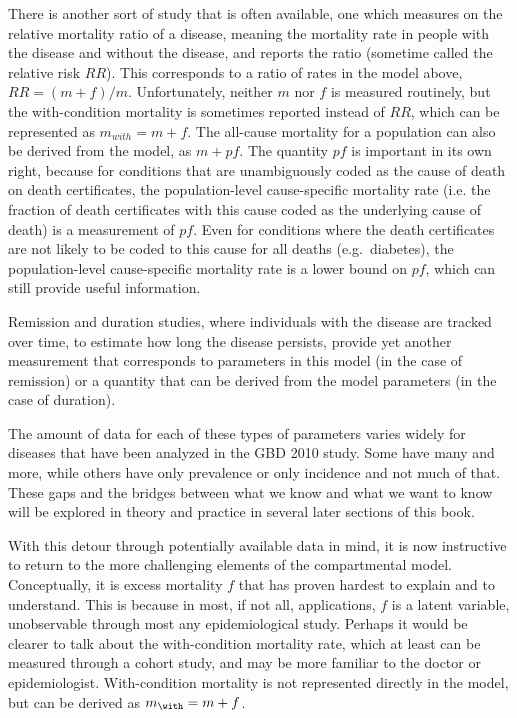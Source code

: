 There is another sort of study that is often available, one which measures on the relative mortality ratio of a disease, meaning the mortality rate in people with the disease and without the disease, and reports the ratio (sometime called the relative risk $RR$).  This corresponds to a ratio of rates in the model above, $RR = (m+f) / m$.  Unfortunately, neither $m$ nor $f$ is measured routinely, but the with-condition mortality is sometimes reported instead of $RR$, which can be represented as $m_{with} = m+f$.  The all-cause mortality for a population can also be derived from the model, as $m + pf$.  The quantity $pf$ is important in its own right, because for conditions that are unambiguously coded as the cause of death on death certificates, the population-level cause-specific mortality rate (i.e. the fraction of death certificates with this cause coded as the underlying cause of death) is a measurement of $pf$.  Even for conditions where the death certificates are not likely to be coded to this cause for all deaths (e.g.~diabetes), the population-level cause-specific mortality rate is a lower bound on $pf$, which can still provide useful information.

Remission and duration studies, where individuals with the disease are tracked over time, to estimate how long the disease persists, provide yet another measurement that corresponds to parameters in this model (in the case of remission) or a quantity that can be derived from the model parameters (in the case of duration).

The amount of data for each of these types of parameters varies widely for diseases that have been analyzed in the GBD 2010 study. Some have many and more, while others have only prevalence or only incidence and not much of that. These gaps and the bridges between what we know and what we want to know will be explored in theory and practice in several later sections of this book.

With this detour through potentially available data in mind, it is now instructive to return to the more challenging elements of the compartmental model. Conceptually, it is excess mortality $f$ that has proven hardest to explain and to understand. This is because in most, if not all, applications, $f$ is a latent variable, unobservable through most any epidemiological study. Perhaps it would be clearer to talk about the with-condition mortality rate, which at least can be measured through a cohort study, and may be more familiar to the doctor or epidemiologist. With-condition mortality is not represented directly in the model, but can be derived as $m_{\with} = m+f$.


